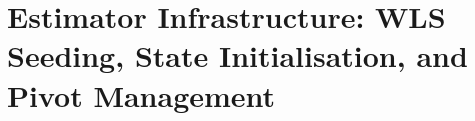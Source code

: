 \documentclass[main.tex]{subfiles}
\begin{document}
\section{Estimator Infrastructure: WLS Seeding, State Initialisation, and Pivot Management}\label{sec:estinfra}

\newcommand{\wlsdesign}{\bm{A}}                 %
\newcommand{\wlsweight}{\bm{W}}                 %
\newcommand{\wlsstate}{\bm{\xi}}                %
\newcommand{\mapw}{m_w}                          %
\newcommand{\coderes}{\widetilde{z}}            %
\newcommand{\medop}{\operatorname{med}}         %
\newcommand{\isbsys}{\mathrm{ISB}}              %
\newcommand{\pclk}{\delta_{\Phi}}              %
\newcommand{\ionoest}{\widehat{I}}              %
\newcommand{\biascoef}{\beta}                   %
\newcommand{\stransform}{\bm{T}}                %
\end{document}
